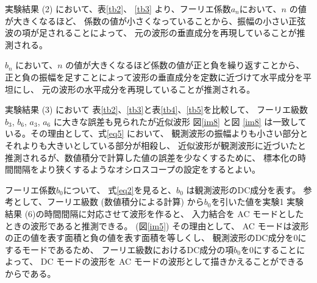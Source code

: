 実験結果 (2) において、表\ref{tb2}、 \ref{tb3} より、フーリエ係数$a_n$において、$n$ の値が大きくなるほど、
係数の値が小さくなっていることから、振幅の小さい正弦波の項が足されることによって、
元の波形の垂直成分を再現していることが推測される。
\par
$b_n$ において、$n$ の値が大きくなるほど係数の値が正と負を繰り返すことから、
正と負の振幅を足すことによって波形の垂直成分を定数に近づけて水平成分を平坦にし、
元の波形の水平成分を再現していることが推測される。
\par
実験結果 (3) において
表\ref{tb2}、\ref{tb3}と表\ref{tb4}、\ref{tb5}を比較して、
フーリエ級数 $b_3$, $b_6$, $a_3$, $a_6$ に大きな誤差も見られたが近似波形
図\ref{im8} と図 \ref{im8} は一致している。その理由として、式\eqref{eq5} において、
観測波形の振幅よりも小さい部分とそれよりも大きいとしている部分が相殺し、
近似波形が観測波形に近づいたと推測されるが、数値積分で計算した値の誤差を少なくするために、
標本化の時間間隔をより狭くするようなオシロスコープの設定をするとよい。
\par
フーリエ係数$b_0$について、
式\ref{eq2}を見ると、$b_0$ は観測波形のDC成分を表す。
参考として、フーリエ級数 (数値積分による計算) から$b_0$を引いた値を実験1
実験結果 (6)の時間間隔に対応させて波形を作ると、
入力結合を AC モードとしたときの波形であると推測できる。
(図\ref{im5}) その理由として、 AC モードは波形の正の値を表す面積と負の値を表す面積を等しくし、
観測波形のDC成分を0にするモードであるため、
フーリエ級数におけるDC成分の項$b_0$を0にすることによって、
DC モードの波形を AC モードの波形として描きかえることができるからである。
